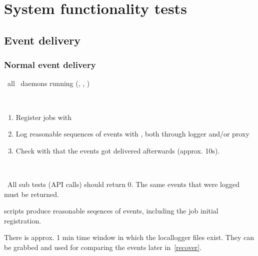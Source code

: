 
\section{System functionality tests}
\label{s:functionality}

\subsection{Event delivery}



\subsubsection{Normal event delivery}
\label{normal}

\req\ all \LB\ daemons running (, ,
)

\what\ 
\begin{enumerate}
\item Register jobs with  
\item Log reasonable sequences of events with , both through logger and/or proxy
\item Check with \code{edg\_wll\_JobLog} that the events got delivered afterwards (approx. 10s).
\end{enumerate}

\how\ 
%

\result\ All sub tests (API calls) should return 0. The same events that were logged must be returned.

\begin{hints}
 scripts produce reasonable seqences of events, including
the job initial registration.

There is approx. 1 min time window in which the locallogger files exist.
They can be grabbed and used for comparing the events later in~\ref{recover}.
\end{hints}



